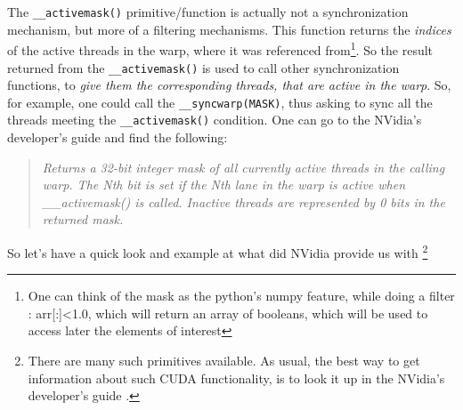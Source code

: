 \documentclass[12pt]{article}
\begin{document}
The \verb|__activemask()| primitive/function is actually not a synchronization 
mechanism, but more of a filtering mechanisms. This function returns the \textit{indices}
of the active threads in the warp, where it was referenced from\footnote{One can think 
of the mask as the python's numpy feature, while doing a filter : {\selectfont arr[:]<1.0}, which 
will return an array of booleans, which will be used to access later the elements of interest}. 
So the result returned from the \verb|__activemask()| is used to call other synchronization functions, 
to \textit{give them the corresponding threads, that are active in the warp}.
So, for example, one could call the  \verb|__syncwarp(MASK)|, thus asking 
to sync all the threads meeting the \verb|__activemask()| condition. 
One can go to the NVidia's developer's guide \cite{center} and find the following:

\begin{quote}
    \textsl{
Returns a 32-bit integer mask of all currently active threads in the calling warp. 
The Nth bit is set if the Nth lane in the warp is active when \_\_activemask() is called. 
Inactive threads are represented by 0 bits in the returned mask.
    }
\end{quote}

So let's have a quick look and example at what did NVidia provide us with 
\footnote{There are many such primitives available. As usual, the best way to get information about such 
CUDA functionality, is to look it up in the NVidia's developer's guide \cite{center}.}
\end{document}
